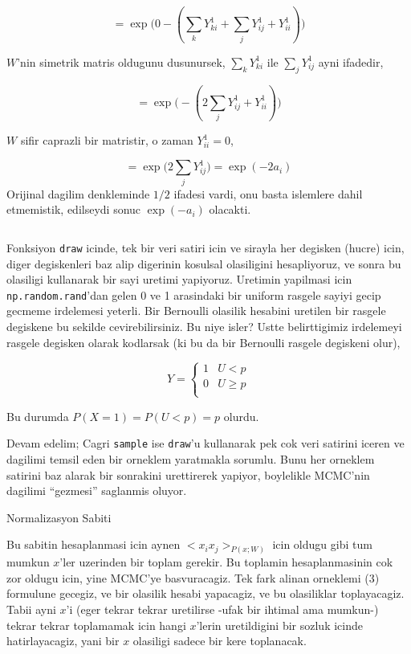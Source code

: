 \documentclass[12pt,fleqn]{article}\usepackage{../common}
\begin{document}
$$ 
= \exp \big( 
0 - ( \sum_{k}  Y_{ki}^1 + \sum_{j} Y_{ij}^1 + Y_{ii}^1  ) 
\big)
 $$

$W$'nin simetrik matris oldugunu dusunursek, $\sum_{k}  Y_{ki}^1$ ile $\sum_{j}Y_{ij}^1$ ayni ifadedir, 

$$ 
= \exp \big( 
- ( 2 \sum_{j} Y_{ij}^1 + Y_{ii}^1  ) 
\big)
 $$

$W$ sifir caprazli bir matristir, o zaman $Y_{ii}^1=0$, 

$$ 
= \exp \big( 2 \sum_{j} Y_{ij}^1 \big) = \exp (- 2 a_i )
 $$
Orijinal dagilim denkleminde $1/2$ ifadesi vardi, onu basta islemlere dahil
etmemistik, edilseydi sonuc  $\exp (- a_i)$ olacakti. 

\inputminted[fontsize=\footnotesize]{python}{boltz.py}

Fonksiyon \verb!draw! icinde, tek bir veri satiri icin ve sirayla her
degisken (hucre) icin, diger degiskenleri baz alip digerinin kosulsal
olasiligini hesapliyoruz, ve sonra bu olasiligi kullanarak bir sayi uretimi
yapiyoruz. Uretimin yapilmasi icin \verb!np.random.rand!'dan gelen 0 ve 1
arasindaki bir uniform rasgele sayiyi gecip gecmeme irdelemesi yeterli. Bir
Bernoulli olasilik hesabini uretilen bir rasgele degiskene bu sekilde
cevirebilirsiniz. Bu niye isler? Ustte belirttigimiz irdelemeyi rasgele
degisken olarak kodlarsak (ki bu da bir Bernoulli rasgele degiskeni olur),

$$ Y = 
\left\{ \begin{array}{ll}
1 & U < p \\
0 & U \ge p \\
\end{array} \right.
 $$

Bu durumda $P(X=1) = P(U<p) = p$ olurdu. 

Devam edelim; Cagri \verb!sample! ise \verb!draw!'u kullanarak pek cok veri
satirini iceren ve dagilimi temsil eden bir orneklem yaratmakla
sorumlu. Bunu her orneklem satirini baz alarak bir sonrakini urettirerek
yapiyor, boylelikle MCMC'nin dagilimi ``gezmesi'' saglanmis oluyor.

Normalizasyon Sabiti

Bu sabitin hesaplanmasi icin aynen $<x_ix_j>_{P(x;W)}$ icin oldugu gibi tum
mumkun $x$'ler uzerinden bir toplam gerekir. Bu toplamin hesaplanmasinin
cok zor oldugu icin, yine MCMC'ye basvuracagiz. Tek fark alinan orneklemi
(3) formulune gecegiz, ve bir olasilik hesabi yapacagiz, ve bu olasiliklar
toplayacagiz. Tabii ayni $x$'i (eger tekrar tekrar uretilirse -ufak bir
ihtimal ama mumkun-) tekrar tekrar toplamamak icin hangi $x$'lerin
uretildigini bir sozluk icinde hatirlayacagiz, yani bir $x$ olasiligi
sadece bir kere toplanacak.
\end{document}
